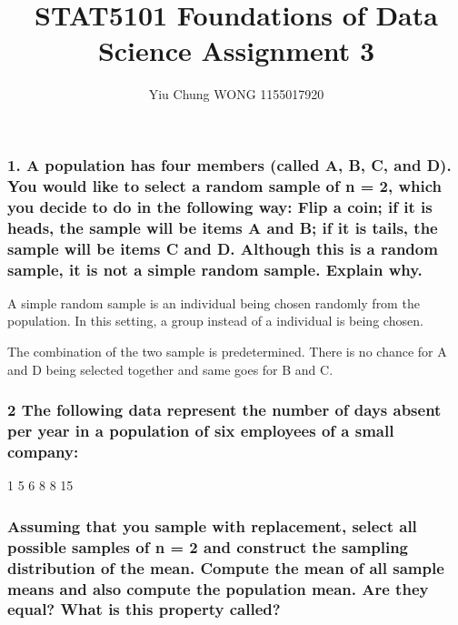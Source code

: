 \documentclass[]{article}
\title{STAT5101 Foundations of Data Science Assignment 3}
\author{Yiu Chung WONG 1155017920}
\date{}
\begin{document}
\maketitle

\subsubsection{1. A population has four members (called A, B, C, and D).
You would like to select a random sample of n = 2, which you decide to
do in the following way: Flip a coin; if it is heads, the sample will be
items A and B; if it is tails, the sample will be items C and D.
Although this is a random sample, it is not a simple random sample.
Explain
why.}\label{a-population-has-four-members-called-a-b-c-and-d.-you-would-like-to-select-a-random-sample-of-n-2-which-you-decide-to-do-in-the-following-way-flip-a-coin-if-it-is-heads-the-sample-will-be-items-a-and-b-if-it-is-tails-the-sample-will-be-items-c-and-d.-although-this-is-a-random-sample-it-is-not-a-simple-random-sample.-explain-why.}

A simple random sample is an individual being chosen randomly from the
population. In this setting, a group instead of a individual is being
chosen.

The combination of the two sample is predetermined. There is no chance
for A and D being selected together and same goes for B and C.

\subsubsection{2 The following data represent the number of days absent
per year in a population of six employees of a small
company:}\label{the-following-data-represent-the-number-of-days-absent-per-year-in-a-population-of-six-employees-of-a-small-company}

1 5 6 8 8 15

\subsubsection{Assuming that you sample with replacement, select all
possible samples of n = 2 and construct the sampling distribution of the
mean. Compute the mean of all sample means and also compute the
population mean. Are they equal? What is this property
called?}\label{assuming-that-you-sample-with-replacement-select-all-possible-samples-of-n-2-and-construct-the-sampling-distribution-of-the-mean.-compute-the-mean-of-all-sample-means-and-also-compute-the-population-mean.-are-they-equal-what-is-this-property-called}
\end{document}

